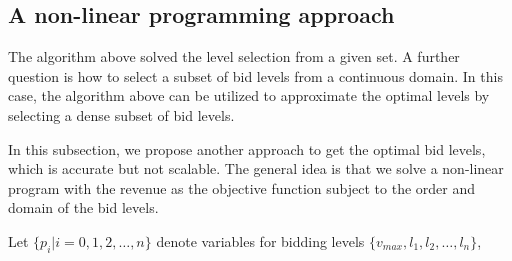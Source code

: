 \documentclass[letterpaper]{article}
\begin{document}
\subsection{A non-linear programming approach}
\label{sec:opt}

The algorithm above solved the level selection from a given set. A further question is how to select a subset of bid levels from a continuous domain.
In this case, the algorithm above can be utilized to approximate the optimal levels by selecting a dense subset of bid levels.

In this subsection, we propose another approach to get the optimal bid levels, which is accurate but not scalable.
The general idea is that we solve a non-linear program with the revenue as the objective function subject to the order and domain of the bid levels.

Let $\{p_i|i=0,1,2,\ldots,n\}$ denote variables for bidding levels $\{v_{max}, l_1,l_2,\ldots,l_n\}$, 
\end{document}
